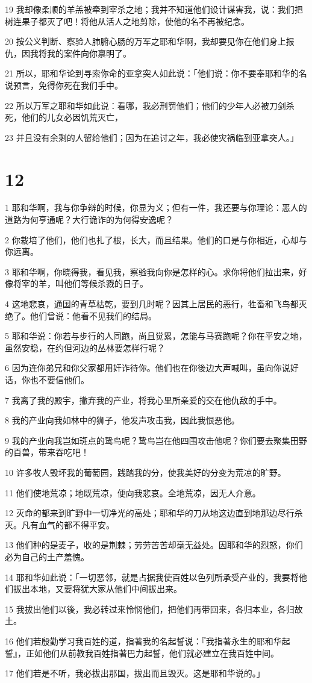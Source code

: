 \par 19 我却像柔顺的羊羔被牵到宰杀之地；我并不知道他们设计谋害我，说：我们把树连果子都灭了吧！将他从活人之地剪除，使他的名不再被纪念。
\par 20 按公义判断、察验人肺腑心肠的万军之耶和华啊，我却要见你在他们身上报仇，因我将我的案件向你禀明了。
\par 21 所以，耶和华论到寻索你命的亚拿突人如此说：「他们说：你不要奉耶和华的名说预言，免得你死在我们手中。
\par 22 所以万军之耶和华如此说：看哪，我必刑罚他们；他们的少年人必被刀剑杀死，他们的儿女必因饥荒灭亡，
\par 23 并且没有余剩的人留给他们；因为在追讨之年，我必使灾祸临到亚拿突人。」

\chapter{12}

\par 1 耶和华啊，我与你争辩的时候，你显为义；但有一件，我还要与你理论：恶人的道路为何亨通呢？大行诡诈的为何得安逸呢？
\par 2 你栽培了他们，他们也扎了根，长大，而且结果。他们的口是与你相近，心却与你远离。
\par 3 耶和华啊，你晓得我，看见我，察验我向你是怎样的心。求你将他们拉出来，好像将宰的羊，叫他们等候杀戮的日子。
\par 4 这地悲哀，通国的青草枯乾，要到几时呢？因其上居民的恶行，牲畜和飞鸟都灭绝了。他们曾说：他看不见我们的结局。
\par 5 耶和华说：你若与步行的人同跑，尚且觉累，怎能与马赛跑呢？你在平安之地，虽然安稳，在约但河边的丛林要怎样行呢？
\par 6 因为连你弟兄和你父家都用奸诈待你。他们也在你後边大声喊叫，虽向你说好话，你也不要信他们。
\par 7 我离了我的殿宇，撇弃我的产业，将我心里所亲爱的交在他仇敌的手中。
\par 8 我的产业向我如林中的狮子，他发声攻击我，因此我恨恶他。
\par 9 我的产业向我岂如斑点的鸷鸟呢？鸷鸟岂在他四围攻击他呢？你们要去聚集田野的百兽，带来吞吃吧！
\par 10 许多牧人毁坏我的葡萄园，践踏我的分，使我美好的分变为荒凉的旷野。
\par 11 他们使地荒凉；地既荒凉，便向我悲哀。全地荒凉，因无人介意。
\par 12 灭命的都来到旷野中一切净光的高处；耶和华的刀从地这边直到地那边尽行杀灭。凡有血气的都不得平安。
\par 13 他们种的是麦子，收的是荆棘；劳劳苦苦却毫无益处。因耶和华的烈怒，你们必为自己的土产羞愧。
\par 14 耶和华如此说：「一切恶邻，就是占据我使百姓以色列所承受产业的，我要将他们拔出本地，又要将犹大家从他们中间拔出来。
\par 15 我拔出他们以後，我必转过来怜悯他们，把他们再带回来，各归本业，各归故土。
\par 16 他们若殷勤学习我百姓的道，指著我的名起誓说：『我指著永生的耶和华起誓』，正如他们从前教我百姓指著巴力起誓，他们就必建立在我百姓中间。
\par 17 他们若是不听，我必拔出那国，拔出而且毁灭。这是耶和华说的。」

